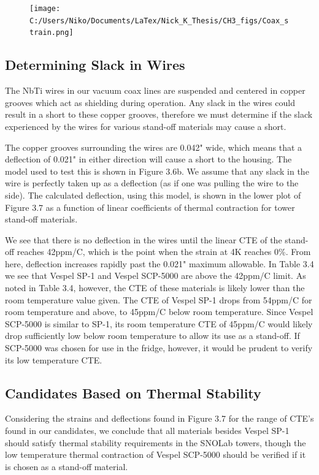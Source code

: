 \documentclass{report}
\begin{document}
\begin{figure}[ht]
\centering
\texttt{[image: C:/Users/Niko/Documents/LaTex/Nick\_K\_Thesis/CH3\_figs/Coax\_strain.png]}
\caption{}
\end{figure}

\subsection{Determining Slack in Wires}

The NbTi wires in our vacuum coax lines are suspended and centered in copper grooves which act as shielding during operation. Any slack in the wires could result in a short to these copper grooves, therefore we must determine if the slack experienced by the wires for various stand-off materials may cause a short.

The copper grooves surrounding the wires are 0.042" wide, which means that a deflection of 0.021" in either direction will cause a short to the housing. The model used to test this is shown in Figure 3.6b. We assume that any slack in the wire is perfectly taken up as a deflection (as if one was pulling the wire to the side). The calculated deflection, using this model, is shown in the lower plot of Figure 3.7 as a function of linear coefficients of thermal contraction for tower stand-off materials.

We see that there is no deflection in the wires until the linear CTE of the stand-off reaches 42ppm/C, which is the point when the strain at 4K reaches 0\%. From here, deflection increases rapidly past the 0.021" maximum allowable. In Table 3.4 we see that Vespel SP-1 and Vespel SCP-5000 are above the 42ppm/C limit. As noted in Table 3.4, however, the CTE of these materials is likely lower than the room temperature value given. The CTE of Vespel SP-1 drops from 54ppm/C for room temperature and above, to 45ppm/C below room temperature. Since Vespel SCP-5000 is similar to SP-1, its room temperature CTE of 45ppm/C would likely drop sufficiently low below room temperature to allow its use as a stand-off. If SCP-5000 was chosen for use in the fridge, however, it would be prudent to verify its low temperature CTE.

\subsection{Candidates Based on Thermal Stability}
Considering the strains and deflections found in Figure 3.7 for the range of CTE's found in our candidates, we conclude that all materials besides Vespel SP-1 should satisfy thermal stability requirements in the SNOLab towers, though the low temperature thermal contraction of Vespel SCP-5000 should be verified if it is chosen as a stand-off material. 
\end{document}
